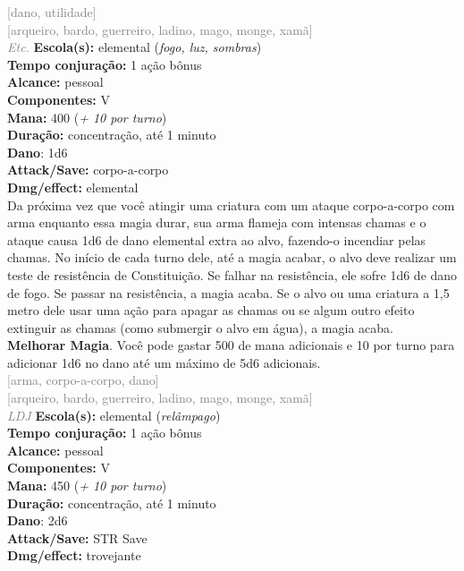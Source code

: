 \documentclass{RPG_Adventure}[2021/10/20]
\begin{document}
{\scriptsize \textcolor{gray}{[dano, utilidade]\\}}
{\scriptsize \textcolor{gray}{[arqueiro, bardo, guerreiro, ladino, mago, monge, xamã]\\}}
{\tiny \textcolor{gray}{\textit{Etc.}}}\jump{}
{\small \t \textbf{Escola(s):} elemental (\textit{fogo, luz, sombras})\\\t \textbf{Tempo conjuração:} 1 ação bônus\\\t \textbf{Alcance:} pessoal\\\t \textbf{Componentes:} V\\\t \textbf{Mana:} 400 (\textit{+ 10 por turno})\\\t \textbf{Duração:} concentração, até 1 minuto\\\t \textbf{Dano}: 1d6\\\t \textbf{Attack/Save:} corpo-a-corpo\\\t \textbf{Dmg/effect:} elemental\\}
{\normalsize Da próxima vez que você atingir uma criatura com um ataque corpo-a-corpo com arma enquanto essa magia durar, sua arma flameja com intensas chamas e o ataque causa 1d6 de dano elemental extra ao alvo, fazendo-o incendiar pelas chamas. No início de cada turno dele, até a magia acabar, o alvo deve realizar um teste de resistência de Constituição. Se falhar na resistência, ele sofre 1d6 de dano de fogo. Se passar na resistência, a magia acaba. Se o alvo ou uma criatura a 1,5 metro dele usar uma ação para apagar as chamas ou se algum outro efeito extinguir as chamas (como submergir o alvo em água), a magia acaba.\\\t \textbf{Melhorar Magia}. Você pode gastar 500 de mana adicionais e 10 por turno para adicionar 1d6 no dano até um máximo de 5d6 adicionais.\\}
{\scriptsize \textcolor{gray}{[arma, corpo-a-corpo, dano]\\}}
{\scriptsize \textcolor{gray}{[arqueiro, bardo, guerreiro, ladino, mago, monge, xamã]\\}}
{\tiny \textcolor{gray}{\textit{LDJ}}}\jump{}
{\small \t \textbf{Escola(s):} elemental (\textit{relâmpago})\\\t \textbf{Tempo conjuração:} 1 ação bônus\\\t \textbf{Alcance:} pessoal\\\t \textbf{Componentes:} V\\\t \textbf{Mana:} 450 (\textit{+ 10 por turno})\\\t \textbf{Duração:} concentração, até 1 minuto\\\t \textbf{Dano}: 2d6\\\t \textbf{Attack/Save:} STR Save\\\t \textbf{Dmg/effect:} trovejante\\}
\end{document}

